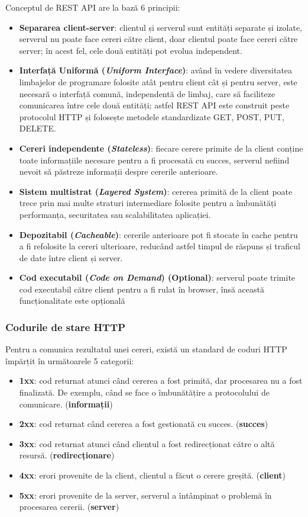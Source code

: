 \par
Conceptul de REST API are la bază 6 principii:
\begin{itemize}
    \item \textbf{Separarea client-server}: clientul și serverul sunt entități separate și izolate,
    serverul nu poate face cereri către client, doar clientul poate face cereri către server; 
    în acest fel, cele două entități pot evolua independent.
    \item \textbf{Interfață Uniformă (\textit{Uniform Interface})}: având în vedere diversitatea limbajelor de programare folosite
    atât pentru client cât și pentru server, este necesară o interfață comună, independentă de limbaj,
    care să faciliteze comunicarea între cele două entități; astfel REST API este construit peste 
    protocolul HTTP și folosește metodele standardizate GET, POST, PUT, DELETE.
    \item \textbf{Cereri independente (\textit{Stateless})}: fiecare cerere primite de la client conține toate informațiile necesare
    pentru a fi procesată cu succes, serverul nefiind nevoit să păstreze informații despre cererile
    anterioare.
    \item \textbf{Sistem multistrat (\textit{Layered System})}: cererea primită de la client poate trece prin mai multe straturi
    intermediare folosite pentru a îmbunătăți performanța, securitatea sau scalabilitatea aplicației.
    \item \textbf{Depozitabil (\textit{Cacheable})}: cererile anterioare pot fi stocate în cache pentru a fi refolosite
    la cereri ulterioare, reducând astfel timpul de răspuns și traficul de date între client și server.
    \item \textbf{Cod executabil (\textit{Code on Demand}) (Optional)}: serverul poate trimite cod executabil către client pentru
    a fi rulat în browser, însă această funcționalitate este opțională
\end{itemize}

\subsubsection{Codurile de stare HTTP}
Pentru a comunica rezultatul unei cereri, există un standard de coduri HTTP împărțit în
următoarele 5 categorii:
\begin{itemize}
    \item \textbf{1xx}: cod returnat atunci când cererea a fost primită, dar procesarea nu a fost finalizată. De exemplu, când se
    face o îmbunătățire a protocolului de comunicare. (\textbf{informații})
    \item \textbf{2xx}: cod returnat când cererea a fost gestionată cu succes. (\textbf{succes})
    \item \textbf{3xx}: cod returnat atunci când clientul a fost redirecționat către o altă resursă. (\textbf{redirecționare})
    \item \textbf{4xx}: erori provenite de la client, clientul a făcut o cerere greșită. (\textbf{client})
    \item \textbf{5xx}: erori provenite de la server, serverul a întâmpinat o problemă în procesarea cererii. (\textbf{server})
\end{itemize}

